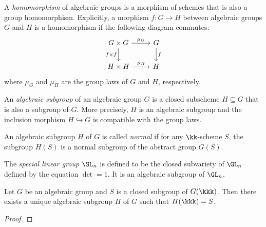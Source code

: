     \begin{definition}\label{def:homomorphism_of_algebraic_groups}
        A \emph{homomorphism} of algebraic groups is a morphism of schemes that is also a group homomorphism.
        Explicitly, a morphism \(f: G \to H\) between algebraic groups \(G\) and \(H\) is a homomorphism if the following diagram commutes:
        \[
            \begin{tikzcd}
                G \times G \arrow{r}{\mu_G} \arrow[d, "f\times f" swap] & G \arrow{d}{f} \\
                H \times H \arrow{r}{\mu_H} & H
            \end{tikzcd}
        \]
        where \(\mu_G\) and \(\mu_H\) are the group laws of \(G\) and \(H\), respectively.
    \end{definition}

    \begin{definition}\label{def:algebraic_subgroup}
        An \emph{algebraic subgroup} of an algebraic group \(G\) is a closed subscheme \(H \subseteq G\) that is also a subgroup of \(G\).
        More precisely, \(H\) is an algebraic subgroup and the inclusion morphism \(H \hookrightarrow G\) is compatible with the group laws.

        An algebraic subgroup \(H\) of \(G\) is called \emph{normal} if for any \(\kk\)-scheme \(S\), the subgroup \(H(S)\) is a normal subgroup of the abstract group \(G(S)\).
    \end{definition}


    \begin{example}\label{eg:special_linear_group}
        The \emph{special linear group} $\SL_n$ is defined to be the closed subvariety of $\GL_n$ defined by the equation \(\det = 1\).
        It is an algebraic subgroup of \(\GL_n\).
    \end{example}

    \begin{proposition}\label{prop:algebraic_group_and_its_closed_points}
        Let \(G\) be an algebraic group and \(S\) is a closed subgroup of \(G(\kkk)\).
        Then there exists a unique algebraic subgroup \(H\) of \(G\) such that \(H(\kkk) = S\).
    \end{proposition}
    \begin{proof}
    \end{proof}

